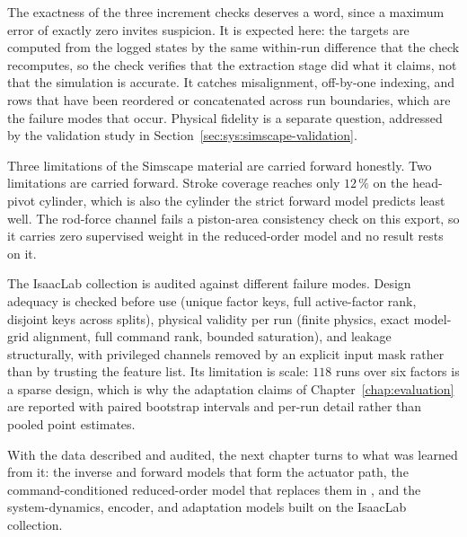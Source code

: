 The exactness of the three increment checks deserves a word, since a
maximum error of exactly zero invites suspicion. It is expected here:
the targets are computed from the logged states by the same within-run
difference that the check recomputes, so the check verifies that the
extraction stage did what it claims, not that the simulation is
accurate. It catches misalignment, off-by-one indexing, and rows that
have been reordered or concatenated across run boundaries, which are the failure modes that occur. Physical fidelity is a separate
question, addressed by the validation study in
Section~\ref{sec:sys:simscape-validation}.

Three limitations of the Simscape material are carried forward honestly.
Two limitations are carried forward. Stroke
coverage reaches only $12\,\%$ on the head-pivot cylinder, which is also the
cylinder the strict forward model predicts least well. The rod-force channel
fails a piston-area consistency check on this export, so it carries zero
supervised weight in the reduced-order model and no result rests on it.

The IsaacLab collection is audited against different failure modes. Design
adequacy is checked before use (unique factor keys, full active-factor rank,
disjoint keys across splits), physical validity per run (finite physics, exact
model-grid alignment, full command rank, bounded saturation), and leakage
structurally, with privileged channels removed by an explicit input mask rather
than by trusting the feature list. Its limitation is scale: $118$ runs over six
factors is a sparse design, which is why the adaptation claims of
Chapter~\ref{chap:evaluation} are reported with paired bootstrap intervals and
per-run detail rather than pooled point estimates.

With the data described and audited, the next chapter turns to what was
learned from it: the inverse and forward models that form the
\ppoIDFD{} actuator path, the command-conditioned reduced-order model
that replaces them in \ppoROM, and the system-dynamics, encoder, and
adaptation models built on the IsaacLab collection.
